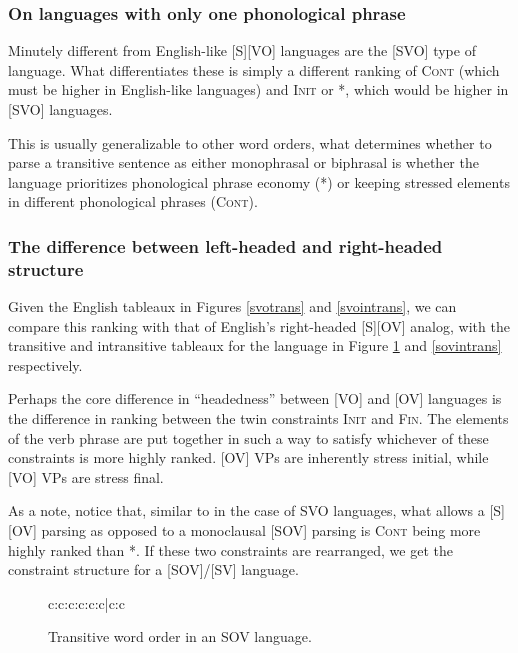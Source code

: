 \documentclass{article}
\newcommand{\cont}{\textsc{Cont}}
\newcommand{\iamb}{\textsc{Iamb}}
\newcommand{\cons}{\textsc{Const}}
\newcommand{\topf}{\textsc{Top1\textsuperscript{st}}}
\newcommand{\nophi}{\textsc{*\textphi}}
\newcommand{\finphi}{\textsc{Fin\textphi}}
\newcommand{\initphi}{\textsc{Init\textphi}}
\newcommand{\troc}{\textsc{Troc}}
\begin{document}
\subsubsection{On languages with only one phonological phrase}

Minutely different from English-like [S][VO] languages are the [SVO] type of language.
What differentiates these is simply a different ranking of {\cont} (which must be higher in English-like languages) and {\initphi} or {\nophi}, which would be higher in [SVO] languages.

This is usually generalizable to other word orders, what determines whether to parse a transitive sentence as either monophrasal or biphrasal is whether the language prioritizes phonological phrase economy ({\nophi}) or keeping stressed elements in different phonological phrases (\cont).

\subsubsection{The difference between left-headed and right-headed structure}

Given the English tableaux in Figures \ref{svotrans} and \ref{svointrans}, we can compare this ranking with that of English's right-headed [S][OV] analog, with the transitive and intransitive tableaux for the language in Figure \ref{sovtrans} and \ref{sovintrans} respectively.

Perhaps the core difference in ``headedness'' between [VO] and [OV] languages is the difference in ranking between the twin constraints {\initphi} and {\finphi}.
The elements of the verb phrase are put together in such a way to satisfy whichever of these constraints is more highly ranked.
[OV] VPs are inherently stress initial, while [VO] VPs are stress final.

As a note, notice that, similar to in the case of SVO languages, what allows a [S][OV] parsing as opposed to a monoclausal [SOV] parsing is {\cont} being more highly ranked than {\nophi}.
If these two constraints are rearranged, we get the constraint structure for a [SOV]/[SV] language.


\begin{figure}
\begin{tableau}{c:c:c:c:c:c|c:c}
		\const{\cont}	\const{\iamb}	\const{\cons}	\const{\initphi}	\const{\topf}	\const{\troc}	\const{\nophi}	\const{\finphi}
\cand[\Optimal]{[S][OV]}	\vio{}	\vio{}	\vio{}	\vio{}	\vio{}	\vio{}	\vio{**}	\vio{*}
\cand{[SOV]}	\vio{*!}	\vio{}	\vio{}	\vio{}	\vio{}	\vio{}	\vio{*}	\vio{*}
\cand{[S][VO]}	\vio{}	\vio{*!}	\vio{}	\vio{*}	\vio{}	\vio{}	\vio{**}	\vio{}
\cand{[VS][O]}	\vio{}	\vio{}	\vio{*!}	\vio{*}	\vio{}	\vio{*}	\vio{**}	\vio{}
\cand{[VO][S]}	\vio{}	\vio{}	\vio{}	\vio{*!}	\vio{*}	\vio{*}	\vio{**}	\vio{}
\end{tableau}
\caption{Transitive word order in an SOV language.\label{sovtrans}}
\end{figure}
\end{document}
